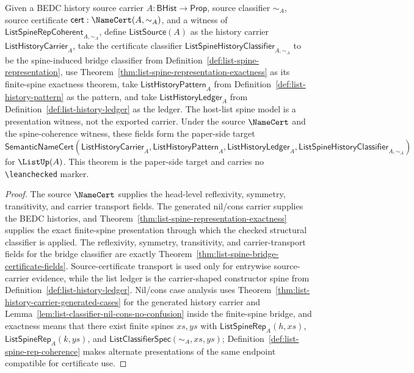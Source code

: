 \begin{theorem}
\label{thm:concrete-list-namecert}
Given a BEDC history source carrier $A : \mathsf{BHist} \to \mathsf{Prop}$,
source classifier $\sim_A$, source certificate
$\mathsf{cert} : \NameCert(A,\sim_A)$, and a witness of
$\mathsf{ListSpineRepCoherent}_{A,\sim_A}$, define
$\mathsf{ListSource}(A)$ as the history carrier
$\mathsf{ListHistoryCarrier}_A$, take the certificate classifier
$\mathsf{ListSpineHistoryClassifier}_{A,\sim_A}$ to be the spine-induced bridge
classifier from Definition~\ref{def:list-spine-representation}, use
Theorem~\ref{thm:list-spine-representation-exactness} as its finite-spine
exactness theorem, take $\mathsf{ListHistoryPattern}_A$ from
Definition~\ref{def:list-history-pattern} as the pattern, and take
$\mathsf{ListHistoryLedger}_A$ from Definition~\ref{def:list-history-ledger}
as the ledger. The host-list spine model is a presentation witness, not the exported carrier. Under the source $\NameCert$ and the spine-coherence witness,
these fields form the paper-side target
$\mathsf{SemanticNameCert}(\mathsf{ListHistoryCarrier}_A,\mathsf{ListHistoryPattern}_A,\mathsf{ListHistoryLedger}_A,\mathsf{ListSpineHistoryClassifier}_{A,\sim_A})$
for $\ListUp(A)$. This theorem is the paper-side target and carries no
\texttt{\textbackslash leanchecked} marker.
\end{theorem}
\begin{proof}
The source $\NameCert$ supplies the head-level reflexivity, symmetry,
transitivity, and carrier transport fields. The generated nil/cons carrier
supplies the BEDC histories, and
Theorem~\ref{thm:list-spine-representation-exactness} supplies the exact
finite-spine presentation through which the checked structural classifier is
applied. The reflexivity, symmetry, transitivity, and carrier-transport fields
for the bridge classifier are exactly
Theorem~\ref{thm:list-spine-bridge-certificate-fields}. Source-certificate
transport is used only for entrywise source-carrier evidence, while the list
ledger is the carrier-shaped constructor spine from
Definition~\ref{def:list-history-ledger}. Nil/cons case analysis uses
Theorem~\ref{thm:list-history-carrier-generated-cases} for the generated history
carrier and Lemma~\ref{lem:list-classifier-nil-cons-no-confusion} inside the
finite-spine bridge, and exactness means that there exist finite spines $xs,ys$
with $\mathsf{ListSpineRep}_A(h,xs)$, $\mathsf{ListSpineRep}_A(k,ys)$, and
$\mathsf{ListClassifierSpec}(\sim_A,xs,ys)$; Definition~\ref{def:list-spine-rep-coherence}
makes alternate presentations of the same endpoint compatible for certificate use.
\end{proof}


